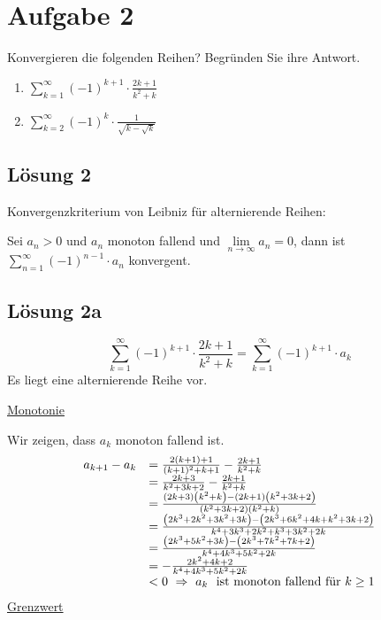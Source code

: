 \documentclass[main.tex]{subfiles}
\begin{document}
\section{Aufgabe 2}
Konvergieren die folgenden Reihen? Begründen Sie ihre Antwort.

\begin{enumerate}
    \item $\sum\limits _{k=1}^{\infty }( -1)^{k+1} \cdotp \frac{2k+1}{k^{2} +k}$
    \item $\sum\limits _{k=2}^{\infty }( -1)^{k} \cdotp \frac{1}{\sqrt{k-\sqrt{k}}}$
\end{enumerate}


\subsection{Lösung 2}
Konvergenzkriterium von Leibniz für alternierende Reihen:

Sei $a_{n}  >0$ und $a_{n}$ monoton fallend und $\lim\limits _{n\rightarrow \infty } a_{n} =0$, dann ist $\sum _{n=1}^{\infty }( -1)^{n-1} \cdotp a_{n}$ konvergent.

\subsection{Lösung 2a}
\begin{equation*}
\sum\limits _{k=1}^{\infty }( -1)^{k+1} \cdotp \frac{2k+1}{k^{2} +k} =\sum\limits _{k=1}^{\infty }( -1)^{k+1} \cdotp a_{k}
\end{equation*}
Es liegt eine alternierende Reihe vor.



\underline{Monotonie}

Wir zeigen, dass $a_{k}$ monoton fallend ist.
\begin{equation*}
\begin{array}{ c l }
a_{k+1} -a_{k} & =\frac{2( k+1) +1}{( k+1)^{2} +k+1} -\frac{2k+1}{k^{2} +k}\\
    & =\frac{2k+3}{k^{2} +3k+2} -\frac{2k+1}{k^{2} +k}\\
    & =\frac{( 2k+3)\left( k^{2} +k\right) -( 2k+1)\left( k^{2} +3k+2\right)}{\left( k^{2} +3k+2\right)\left( k^{2} +k\right)}\\
    & =\frac{\left( 2k^{3} +2k^{2} +3k^{2} +3k\right) -\left( 2k^{3} +6k^{2} +4k+k^{2} +3k+2\right)}{k^{4} +3k^{3} +2k^{2} +k^{3} +3k^{2} +2k}\\
    & =\frac{\left( 2k^{3} +5k^{2} +3k\right) -\left( 2k^{3} +7k^{2} +7k+2\right)}{k^{4} +4k^{3} +5k^{2} +2k}\\
    & =-\frac{2k^{2} +4k+2}{k^{4} +4k^{3} +5k^{2} +2k}\\
    & < 0\ \Rightarrow \ a_{k} \ \text{ ist monoton fallend für} \ k\geq 1
\end{array}
\end{equation*}
\underline{Grenzwert}
\end{document}

